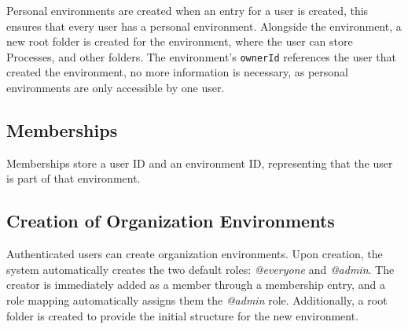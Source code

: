 %
%

Personal environments are created when an entry for a user is created, this ensures that
every user has a personal environment.
Alongside the environment, a new root folder is created for the environment, where the
user can store Processes, and other folders.
The environment's \lstinline{ownerId} references the user that created the environment,
no more information is necessary, as personal environments are only accessible by one
user.

\subsection{Memberships}

Memberships store a user ID and an environment ID, representing that the user is part of that environment.

\subsection{Creation of Organization Environments}

Authenticated users can create organization environments.
Upon creation, the system automatically creates the two default roles: \textit{@everyone}
and \textit{@admin}.
The creator is immediately added as a member through a membership entry,
and a role mapping automatically assigns them the \textit{@admin} role.
Additionally, a root folder is created to provide the initial structure for the new environment.


